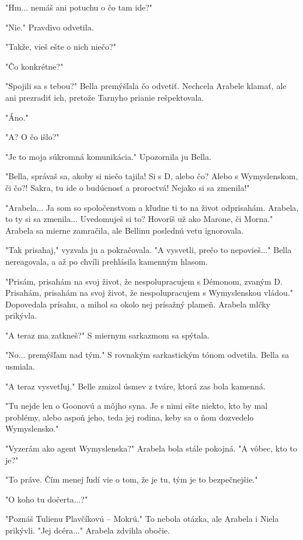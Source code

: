 \documentclass{book}
\begin{document}
"$ $Hm... nemáš ani potuchu o čo tam ide?"$ $ 

"$ $Nie."$ $  Pravdivo odvetila.

"$ $Takže, vieš ešte o nich niečo?"$ $ 

"$ $Čo konkrétne?"$ $ 

"$ $Spojili sa s tebou?"$ $  Bella premýšľala čo odvetiť. Nechcela Arabele klamať, ale ani prezradiť ich, pretože Tarnyho prianie rešpektovala.

"$ $Áno."$ $ 

"$ $A? O čo išlo?"$ $ 

"$ $Je to moja súkromná komunikácia."$ $  Upozornila ju Bella.

"$ $Bella, správaš sa, akoby si niečo tajila! Si s D, alebo čo? Alebo s Wymyslenskom, či čo?! Sakra, tu ide o budúcnosť a proroctvá! Nejako si sa zmenila!"$ $ 

"$ $Arabela... Ja som so spoločenstvom a kľudne ti to na život odprisahám. Arabela, to ty si sa zmenila... Uvedomuješ si to? Hovoríš už ako Marone, či Morna."$ $  Arabela sa mierne zamračila, ale Bellinu poslednú vetu ignorovala.

"$ $Tak prisahaj,"$ $  vyzvala ju a pokračovala. "$ $A vysvetli, prečo to nepovieš..."$ $  Bella nereagovala, a až po chvíli prehlásila kamenným hlasom.

"$ $Prisám, prisahám na svoj život, že nespolupracujem s Démonom, zvaným D. Prisahám, prisahám na svoj život, že nespolupracujem s Wymyslenskou vládou."$ $  Dopovedala prísahu, a mihol sa okolo nej prísažný plameň. Arabela mlčky prikývla.

"$ $A teraz ma zatkneš?"$ $  S miernym sarkazmom sa spýtala.

"$ $No... premýšľam nad tým."$ $  S rovnakým sarkastickým tónom odvetila. Bella sa usmiala.

"$ $A teraz vysvetľuj."$ $  Belle zmizol úsmev z tváre, ktorá zas bola kamenná.

"$ $Tu nejde len o Goonovú a môjho syna. Je s nimi ešte niekto, kto by mal problémy, alebo aspoň jeho, teda jej rodina, keby sa o ňom dozvedelo Wymyslensko."$ $ 

"$ $Vyzerám ako agent Wymyslenska?"$ $  Arabela bola stále pokojná. "$ $A vôbec, kto to je?"$ $ 

"$ $To práve. Čím menej ľudí vie o tom, že je tu, tým je to bezpečnejšie."$ $ 

"$ $O koho tu dočerta...?"$ $ 

"$ $Poznáš Tulienu Plavčíkovú – Mokrú."$ $  To nebola otázka, ale Arabela i Niela prikývli. "$ $Jej dcéra..."$ $  Arabela zdvihla obočie.
\end{document}
